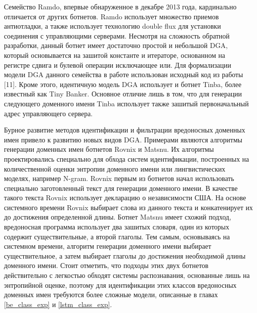 Семейство Ramdo, впервые обнаруженное в декабре 2013 года, кардинально отличается от других ботнетов. Ramdo использует множество приемов антиотладки, а также использует технологию double flux для установки соединения с управляющими серверами. Несмотря на сложность обратной разработки, данный ботнет имеет достаточно простой и небольшой DGA, который основывается на зашитой константе и итераторе, основанном на регистре сдвига и булевой операции исключающее или. Для формализации модели DGA данного семейства в работе использован исходный код из работы [11]. Кроме этого, идентичную модель DGA использует и ботнет Tinba, более известный как Tiny Banker. Основное отличие лишь в том, что для генерации следующего доменного имени Tinba использует также зашитый первоначальный адрес управляющего сервера.

Бурное развитие методов идентификации и фильтрации вредоносных доменных имен привело к развитию новых видов DGA. Примерами являются алгоритмы генерации доменных имен ботнетов Rovnix и Matsnu. Их алгоритмы проектировались специально для обхода систем идентификации, построенных на количественной оценки энтропии доменного имени или лингвистических моделях, например N-gram. Rovnix первым из ботнетов начал использовать специально заготовленный текст для генерации доменного имени. В качестве такого текста Rovnix использует декларацию о независимости США. На основе системного времени Rovnix выбирает слова из данного текста и конкатенирует их до достижения определенной длины. Ботнет Matsnu имеет схожий подход, вредоносная программа использует два зашитых словаря, один из которых содержит существительные, а второй глаголы. Тем самым, основываясь на системном времени, алгоритм генерации доменного имени выбирает существительное, а затем выбирает глаголы до достижения необходимой длины доменного имени. Стоит отметить, что подходы этих двух ботнетов действительно с легкостью обходят системы распознавания, основанные лишь на энтропийной оценке, поэтому для идентификации этих классов вредоносных доменных имен требуются более сложные модели, описанные в главах \ref{be_class_exp} и \ref{lstm_class_exp}.
\clearpage

